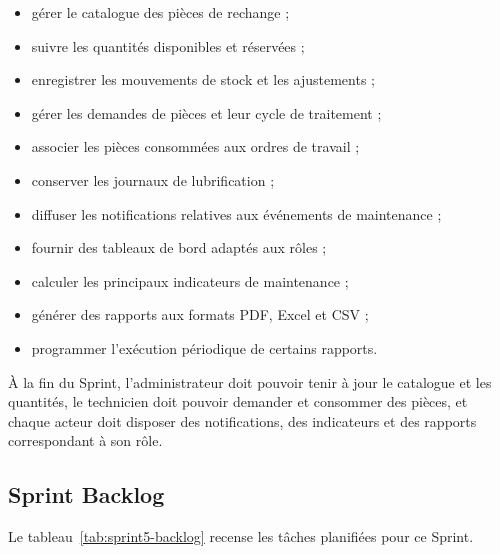 \begin{itemize}
    \item gérer le catalogue des pièces de rechange ;
    \item suivre les quantités disponibles et réservées ;
    \item enregistrer les mouvements de stock et les ajustements ;
    \item gérer les demandes de pièces et leur cycle de traitement ;
    \item associer les pièces consommées aux ordres de travail ;
    \item conserver les journaux de lubrification ;
    \item diffuser les notifications relatives aux événements de maintenance ;
    \item fournir des tableaux de bord adaptés aux rôles ;
    \item calculer les principaux indicateurs de maintenance ;
    \item générer des rapports aux formats PDF, Excel et CSV ;
    \item programmer l'exécution périodique de certains rapports.
\end{itemize}

À la fin du Sprint, l'administrateur doit pouvoir tenir à jour le catalogue et les quantités, le technicien doit pouvoir demander et consommer des pièces, et chaque acteur doit disposer des notifications, des indicateurs et des rapports correspondant à son rôle.

\subsection{Sprint Backlog}

Le tableau~\ref{tab:sprint5-backlog} recense les tâches planifiées pour ce Sprint.

